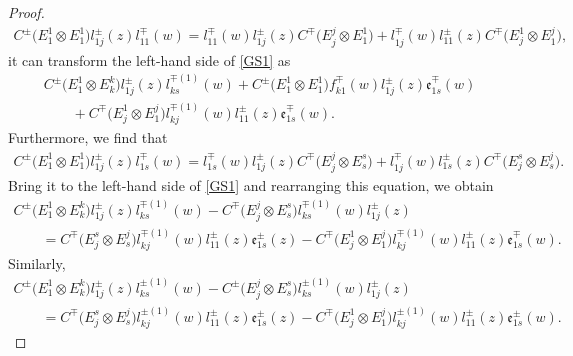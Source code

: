\documentclass[pdftex]{sigma}
\numberwithin{equation}{section}
\begin{document}
\begin{proof}
\begin{gather*}
 C^{\pm}\bigl(E^1_1\otimes E^1_1\bigr)l_{1j}^{\pm}(z)l_{11}^{\mp}(w)= l_{11}^{\mp}(w)l_{1j}^{\pm}(z)C^{\mp}\bigl(E^j_j\otimes E^1_1\bigr)+l_{1j}^{\mp}(w)l_{11}^{\pm}(z)C^{\mp}\bigl(E^1_j\otimes E^j_1\bigr),
\end{gather*}
it can transform the left-hand side of \eqref{GS1} as
\begin{gather*}
 C^{\pm}\bigl(E^1_1\otimes E^k_k\bigr)l_{1j}^{\pm}(z)l_{ks}^{\mp(1)}(w)+ C^{\pm}\bigl(E^1_1\otimes E^1_1\bigr)f_{k1}^{\mp}(w)l_{1j}^{\pm}(z)\mathfrak{e}_{1s}^{\mp}(w)\\
 \qquad{}+
 C^{\mp}\bigl(E^1_j\otimes E^j_1\bigr)l_{kj}^{\mp(1)}(w)l_{11}^{\pm}(z)\mathfrak{e}_{1s}^{\mp}(w).
\end{gather*}
Furthermore, we find that
\begin{gather*}
 C^{\pm}\bigl(E^1_1\otimes E^1_1\bigr)l_{1j}^{\pm}(z)l_{1s}^{\mp}(w)= l_{1s}^{\mp}(w)l_{1j}^{\pm}(z)C^{\mp}\bigl(E^j_j\otimes E^s_s\bigr)+l_{1j}^{\mp}(w)l_{1s}^{\pm}(z)C^{\mp}\bigl(E^s_j\otimes E^j_s\bigr).
\end{gather*}
Bring it to the left-hand side of \eqref{GS1} and rearranging this equation, we obtain
\begin{gather}
 C^{\pm}\bigl(E^1_1\otimes E^k_k\bigr)l_{1j}^{\pm}(z)l_{ks}^{\mp(1)}(w)- C^{\mp}\bigl(E^j_j\otimes E^s_s\bigr)l_{ks}^{\mp(1)}(w)l_{1j}^{\pm}(z) \nonumber\\ \qquad=C^{\mp}\bigl(E^s_j\otimes E^j_s\bigr)l_{kj}^{\mp(1)}(w)l_{11}^{\pm}(z)\mathfrak{e}_{1s}^{\pm}(z)-C^{\mp}\bigl(E^1_j\otimes E^j_1\bigr)l_{kj}^{\mp(1)}(w)l_{11}^{\pm}(z)\mathfrak{e}_{1s}^{\mp}(w).\label{GS2}
\end{gather}
Similarly,
\begin{gather*}%
 C^{\pm}\bigl(E^1_1\otimes E^k_k\bigr)l_{1j}^{\pm}(z)l_{ks}^{\pm(1)}(w)- C^{\pm}\bigl(E^j_j\otimes E^s_s\bigr)l_{ks}^{\pm(1)}(w)l_{1j}^{\pm}(z) \\ \qquad =C^{\mp}\bigl(E^s_j\otimes E^j_s\bigr)l_{kj}^{\pm(1)}(w)l_{11}^{\pm}(z)\mathfrak{e}_{1s}^{\pm}(z)-C^{\mp}\bigl(E^1_j\otimes E^j_1\bigr)l_{kj}^{\pm(1)}(w)l_{11}^{\pm}(z)\mathfrak{e}_{1s}^{\pm}(w).
\end{gather*}





\end{proof}
\end{document}
